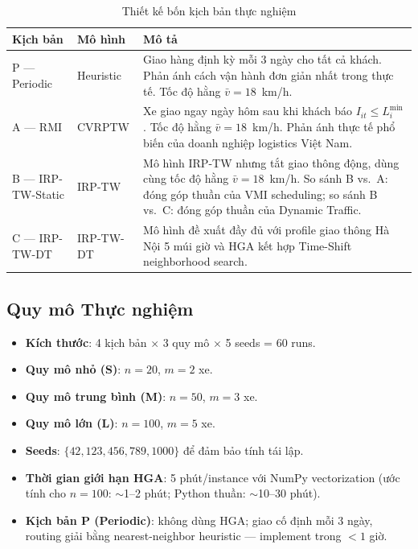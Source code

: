 \documentclass[12pt,a4paper]{article}
\begin{document}
\begin{table}[htbp]
\centering
\caption{Thiết kế bốn kịch bản thực nghiệm}
\label{tab:scenarios}
\renewcommand{\arraystretch}{1.3}
\begin{tabularx}{\linewidth}{@{}l l X@{}}
\toprule
\textbf{Kịch bản} & \textbf{Mô hình} & \textbf{Mô tả} \\
\midrule
\rowcolor{lightblue}
P --- Periodic & Heuristic & Giao hàng định kỳ mỗi 3 ngày cho tất cả khách.
           Phản ánh cách vận hành đơn giản nhất trong thực tế.
           Tốc độ hằng $\bar{v} = 18$~km/h. \\
\rowcolor{lightred}
A --- RMI & CVRPTW & Xe giao ngay ngày hôm sau khi khách báo
           $I_{it} \leq L_i^{\min}$. Tốc độ hằng $\bar{v} = 18$~km/h.
           Phản ánh thực tế phổ biến của doanh nghiệp logistics Việt Nam. \\
\rowcolor{lightyellow}
B --- IRP-TW-Static & IRP-TW & Mô hình IRP-TW nhưng tắt giao thông động,
           dùng cùng tốc độ hằng $\bar{v} = 18$~km/h.
           So sánh B vs.\ A: đóng góp thuần của VMI scheduling;
           so sánh B vs.\ C: đóng góp thuần của Dynamic Traffic. \\
\rowcolor{lightgreen}
C --- IRP-TW-DT & IRP-TW-DT & Mô hình đề xuất đầy đủ với profile giao thông
           Hà Nội 5 múi giờ và HGA kết hợp Time-Shift neighborhood search. \\
\bottomrule
\end{tabularx}
\end{table}

\subsection{Quy mô Thực nghiệm}

\begin{itemize}[leftmargin=*]
  \item \textbf{Kích thước}: 4 kịch bản $\times$ 3 quy mô $\times$ 5 seeds = 60 runs.
  \item \textbf{Quy mô nhỏ (S)}: $n = 20$, $m = 2$ xe.
  \item \textbf{Quy mô trung bình (M)}: $n = 50$, $m = 3$ xe.
  \item \textbf{Quy mô lớn (L)}: $n = 100$, $m = 5$ xe.
  \item \textbf{Seeds}: $\{42, 123, 456, 789, 1000\}$ để đảm bảo tính tái lập.
  \item \textbf{Thời gian giới hạn HGA}: 5 phút/instance với NumPy vectorization
        (ước tính cho $n=100$: $\sim$1--2 phút; Python thuần: $\sim$10--30 phút).
  \item \textbf{Kịch bản P (Periodic)}: không dùng HGA; giao cố định mỗi 3 ngày,
        routing giải bằng nearest-neighbor heuristic --- implement trong $< 1$ giờ.
\end{itemize}
\end{document}
